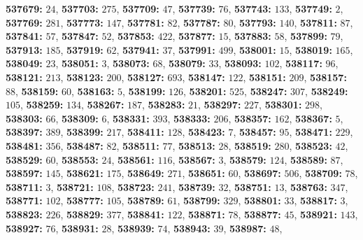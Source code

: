 \textsf{\bfseries 537679:} $24$, \textsf{\bfseries 537703:} $275$, \textsf{\bfseries 537709:} $47$, \textsf{\bfseries 537739:} $76$, \textsf{\bfseries 537743:} $133$, \textsf{\bfseries 537749:} $2$, \textsf{\bfseries 537769:} $281$, \textsf{\bfseries 537773:} $147$, \textsf{\bfseries 537781:} $82$, \textsf{\bfseries 537787:} $80$, \textsf{\bfseries 537793:} $140$, \textsf{\bfseries 537811:} $87$, \textsf{\bfseries 537841:} $57$, \textsf{\bfseries 537847:} $52$, \textsf{\bfseries 537853:} $422$, \textsf{\bfseries 537877:} $15$, \textsf{\bfseries 537883:} $58$, \textsf{\bfseries 537899:} $79$, \textsf{\bfseries 537913:} $185$, \textsf{\bfseries 537919:} $62$, \textsf{\bfseries 537941:} $37$, \textsf{\bfseries 537991:} $499$, \textsf{\bfseries 538001:} $15$, \textsf{\bfseries 538019:} $165$, \textsf{\bfseries 538049:} $23$, \textsf{\bfseries 538051:} $3$, \textsf{\bfseries 538073:} $68$, \textsf{\bfseries 538079:} $33$, \textsf{\bfseries 538093:} $102$, \textsf{\bfseries 538117:} $96$, \textsf{\bfseries 538121:} $213$, \textsf{\bfseries 538123:} $200$, \textsf{\bfseries 538127:} $693$, \textsf{\bfseries 538147:} $122$, \textsf{\bfseries 538151:} $209$, \textsf{\bfseries 538157:} $88$, \textsf{\bfseries 538159:} $60$, \textsf{\bfseries 538163:} $5$, \textsf{\bfseries 538199:} $126$, \textsf{\bfseries 538201:} $525$, \textsf{\bfseries 538247:} $307$, \textsf{\bfseries 538249:} $105$, \textsf{\bfseries 538259:} $134$, \textsf{\bfseries 538267:} $187$, \textsf{\bfseries 538283:} $21$, \textsf{\bfseries 538297:} $227$, \textsf{\bfseries 538301:} $298$, \textsf{\bfseries 538303:} $66$, \textsf{\bfseries 538309:} $6$, \textsf{\bfseries 538331:} $393$, \textsf{\bfseries 538333:} $206$, \textsf{\bfseries 538357:} $162$, \textsf{\bfseries 538367:} $5$, \textsf{\bfseries 538397:} $389$, \textsf{\bfseries 538399:} $217$, \textsf{\bfseries 538411:} $128$, \textsf{\bfseries 538423:} $7$, \textsf{\bfseries 538457:} $95$, \textsf{\bfseries 538471:} $229$, \textsf{\bfseries 538481:} $356$, \textsf{\bfseries 538487:} $82$, \textsf{\bfseries 538511:} $77$, \textsf{\bfseries 538513:} $28$, \textsf{\bfseries 538519:} $280$, \textsf{\bfseries 538523:} $42$, \textsf{\bfseries 538529:} $60$, \textsf{\bfseries 538553:} $24$, \textsf{\bfseries 538561:} $116$, \textsf{\bfseries 538567:} $3$, \textsf{\bfseries 538579:} $124$, \textsf{\bfseries 538589:} $87$, \textsf{\bfseries 538597:} $145$, \textsf{\bfseries 538621:} $175$, \textsf{\bfseries 538649:} $271$, \textsf{\bfseries 538651:} $60$, \textsf{\bfseries 538697:} $506$, \textsf{\bfseries 538709:} $78$, \textsf{\bfseries 538711:} $3$, \textsf{\bfseries 538721:} $108$, \textsf{\bfseries 538723:} $241$, \textsf{\bfseries 538739:} $32$, \textsf{\bfseries 538751:} $13$, \textsf{\bfseries 538763:} $347$, \textsf{\bfseries 538771:} $102$, \textsf{\bfseries 538777:} $105$, \textsf{\bfseries 538789:} $61$, \textsf{\bfseries 538799:} $329$, \textsf{\bfseries 538801:} $33$, \textsf{\bfseries 538817:} $3$, \textsf{\bfseries 538823:} $226$, \textsf{\bfseries 538829:} $377$, \textsf{\bfseries 538841:} $122$, \textsf{\bfseries 538871:} $78$, \textsf{\bfseries 538877:} $45$, \textsf{\bfseries 538921:} $143$, \textsf{\bfseries 538927:} $76$, \textsf{\bfseries 538931:} $28$, \textsf{\bfseries 538939:} $74$, \textsf{\bfseries 538943:} $39$, \textsf{\bfseries 538987:} $48$, 
